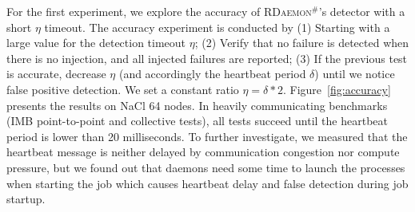 \documentclass[sigconf]{acmart}
\newcommand{\ourwork}[0]{\textsc{RDaemon}\ensuremath{^\#}\xspace}
\newcommand{\imb}[0]{\textsc{IMB}\xspace}
\begin{document}
For the first experiment, we explore the accuracy of \ourwork's detector with a short $\eta$ timeout.
%
The accuracy experiment is conducted by (1) Starting with a large value for the
detection timeout $\eta$; (2) Verify that no failure is detected when there is no injection, and all injected failures are reported; (3) If the previous test is accurate, decrease $\eta$ (and accordingly the heartbeat period $\delta$) until we notice false positive detection. We set a constant ratio $\eta = \delta * 2$.
 Figure~\ref{fig:accuracy} presents the results on NaCl 64 nodes.
 In heavily communicating benchmarks
 (\imb point-to-point and collective tests), all tests succeed until the
  heartbeat period is lower than 20 milliseconds. To further investigate,
  we measured that the heartbeat message is neither delayed by communication
  congestion nor compute pressure, but we found out that daemons need some time to launch the processes when starting the job which causes heartbeat delay and false detection during job startup.
  

\end{document}
